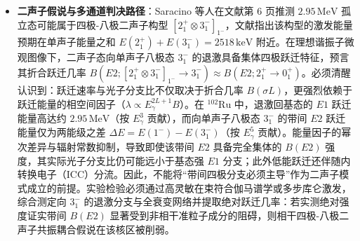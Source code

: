 \begin{itemize}
\item \textbf{二声子假说与多通道判决路径}：Saracino 等人在文献第 6 页推测 $2.95\,\mathrm{MeV}$ 孤立态可能属于四极-八极二声子构型 $[2_1^+ \otimes 3_1^-]_{1^-}$，文献指出该构型的激发能量预期在单声子能量之和 $E(2_1^+) + E(3_1^-) = 2518\,\mathrm{keV}$ 附近。在理想谐振子微观图像下，二声子态向单声子八极态 $3_1^-$ 的退激具备集体四极跃迁特征，预言其折合跃迁几率 $B(E2; [2_1^+ \otimes 3_1^-]_{1^-} \to 3_1^-) \approx B(E2; 2_1^+ \to 0_1^+)$。必须清醒认识到：跃迁速率与光子分支比不仅取决于折合几率 $B(\sigma L)$，更强烈依赖于跃迁能量的相空间因子（$\lambda \propto E_\gamma^{2L+1} B$）。在 $^{102}\mathrm{Ru}$ 中，退激回基态的 $E1$ 跃迁能量高达约 $2.95\,\mathrm{MeV}$（按 $E_\gamma^3$ 贡献），而向单声子八极态 $3_1^-$ 的带间 $E2$ 跃迁能量仅为两能级之差 $\Delta E = E(1^-) - E(3_1^-)$（按 $E_\gamma^5$ 贡献）。能量因子的幂次差异与辐射常数抑制，导致即使该带间 $E2$ 具备完全集体的 $B(E2)$ 强度，其实际光子分支比仍可能远小于基态强 $E1$ 分支；此外低能跃迁还伴随内转换电子（ICC）分流。因此，不能将“带间四极分支必须主导”作为二声子模式成立的前提。实验检验必须通过高灵敏在束符合伽马谱学或多步库仑激发，综合测定向 $3_1^-$ 的退激分支与全衰变网络并提取绝对跃迁几率：若实测绝对强度证实带间 $B(E2)$ 显著受到非相干准粒子成分的阻碍，则相干四极-八极二声子共振耦合假说在该核区被削弱。
\end{itemize}

